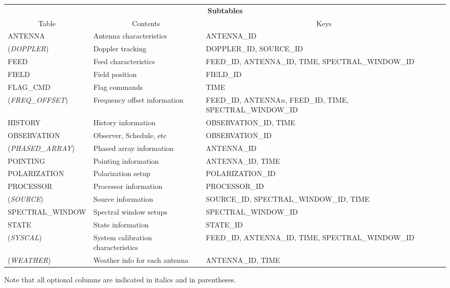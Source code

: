 \documentclass{article}
\begin{document}
\begin{tabular}{|l|p{1.5in}|p{1.6in}|} \hline
\multicolumn{3}{|c|}{\bf Subtables}\\ \cline{1-3}
\multicolumn{1}{|c|}{Table}&\multicolumn{1}{|c|}{Contents}&\multicolumn{1}{|c|}{Keys}\\ \cline{1-3}
ANTENNA& Antenna characteristics & ANTENNA\_ID \\
({\it DOPPLER}) & Doppler tracking & DOPPLER\_ID, SOURCE\_ID \\
FEED  &          Feed characteristics & FEED\_ID, ANTENNA\_ID, TIME, SPECTRAL\_WINDOW\_ID \\
FIELD  &         Field position & FIELD\_ID  \\
FLAG\_CMD  &  Flag commands & TIME \\
({\it FREQ\_OFFSET}) & Frequency offset information & FEED\_ID, ANTENNA$n$, FEED\_ID, TIME, SPECTRAL\_WINDOW\_ID \\
HISTORY  & History information & OBSERVATION\_ID, TIME \\
OBSERVATION  &Observer, Schedule, etc & OBSERVATION\_ID \\ 
({\it PHASED\_ARRAY}) & Phased array information & ANTENNA\_ID \\
POINTING & Pointing information & ANTENNA\_ID, TIME \\
POLARIZATION &Polarization setup & POLARIZATION\_ID \\
PROCESSOR & Processor information & PROCESSOR\_ID  \\
({\it SOURCE})  &        Source information & SOURCE\_ID, SPECTRAL\_WINDOW\_ID, TIME \\
SPECTRAL\_WINDOW  &     Spectral window setups & SPECTRAL\_WINDOW\_ID \\
STATE   & State information & STATE\_ID \\
({\it SYSCAL}) &         System calibration characteristics & FEED\_ID, ANTENNA\_ID, TIME, SPECTRAL\_WINDOW\_ID \\
({\it WEATHER})  &       Weather info for each antenna & ANTENNA\_ID, TIME \\
\hline
\end{tabular}

\par

Note that all optional columns are indicated in italics and in parentheses.
\end{document}

